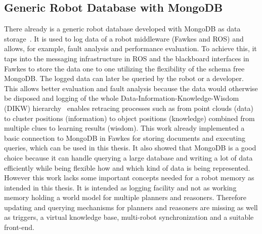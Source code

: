 \documentclass[a4paper,11pt]{article}
\begin{document}
\subsection{Generic Robot Database with MongoDB}
\label{sec:mongo-logging}
There already is a generic robot database developed with MongoDB as
data storage~\cite{RoboDB}. It is used to log data of a
robot middleware (Fawkes and ROS) and allows, for example, fault analysis and performance
evaluation. To achieve this, it taps into the messaging infrastructure
in ROS and the blackboard interfaces in Fawkes to store the data one
to one utilizing the flexibility of the schema free MongoDB. The
logged data can later be queried by the robot or a developer. This
allows better evaluation and fault analysis because the data would
otherwise be disposed and logging of the whole
Data-Information-Knowledge-Wisdom (DIKW) hierarchy~\cite{DIKW} enables
retracing processes such as from point clouds (data) to cluster
positions (information) to object positions (knowledge) combined from
multiple clues to learning results (wisdom). This work already
implemented a basic connection to MongoDB in Fawkes for storing
documents and executing queries, which can be used in this thesis. It
also showed that MongoDB is a good choice because it can handle
querying a large database and writing a lot of data efficiently while
being flexible how and which kind of data is being represented.
However this work lacks some important concepts needed for a robot
memory as intended in this thesis. It is intended as logging facility
and not as working memory holding a world model for multiple planners
and reasoners. Therefore updating and querying mechanisms for planners
and reasoners are missing as well as triggers, a virtual knowledge
base, multi-robot synchronization and a suitable front-end.
\end{document}
